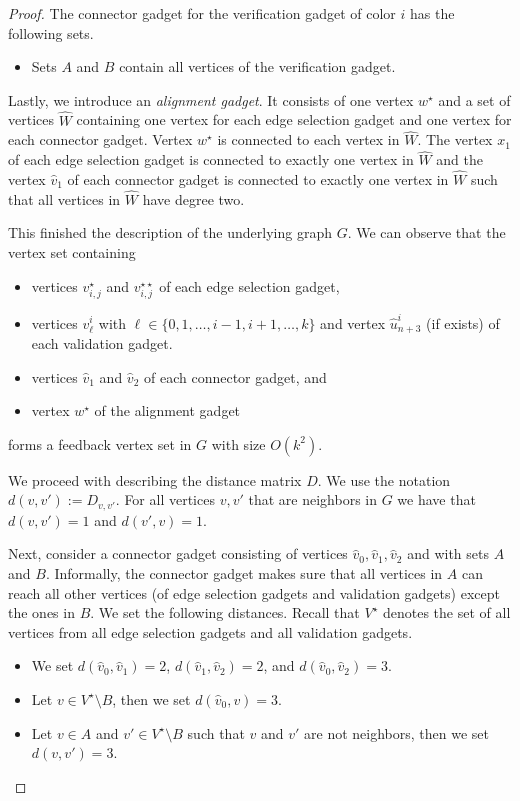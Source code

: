 \documentclass[11pt,a4paper]{article}
\theoremstyle{remark}
\theoremstyle{definition}
\begin{document}
\begin{proof}
    The connector gadget for the verification gadget of color $i$ has the following sets.
    \begin{itemize}
        \item Sets $A$ and $B$ contain all vertices of the verification gadget. %
    \end{itemize}

Lastly, we introduce an \emph{alignment gadget}. It consists of one vertex $w^\star$ and a set of vertices $\hat{W}$ containing one vertex for each edge selection gadget and one vertex for each connector gadget. Vertex $w^\star$ is connected to each vertex in $\hat{W}$.
The vertex $x_1$ of each edge selection gadget is connected to exactly one vertex in $\hat{W}$ and the vertex $\hat{v}_1$ of each connector gadget is connected to exactly one vertex in $\hat{W}$ such that all vertices in $\hat{W}$ have degree two.

This finished the description of the underlying graph $G$. We can observe that the vertex set containing
\begin{itemize}
    \item vertices $v_{i,j}^\star$ and $v_{i,j}^{\star\star}$ of each edge selection gadget,
    \item vertices $v^i_\ell$ with $\ell\in\{0,1,\ldots,i-1,i+1,\ldots,k\}$ and vertex $\hat{u}^i_{n+3}$ (if exists) of each validation gadget.
    \item vertices $\hat{v}_1$ and $\hat{v}_2$ of each connector gadget, and
    \item vertex $w^\star$ of the alignment gadget
\end{itemize}
forms a feedback vertex set in $G$ with size $O(k^2)$.

We proceed with describing the distance matrix $D$. We use the notation $d(v,v'):= D_{v,v'}$. For all vertices $v,v'$ that are neighbors in $G$ we have that $d(v,v')=1$ and $d(v',v)=1$.

Next, consider a connector gadget consisting of vertices $\hat{v}_0,\hat{v}_1,\hat{v}_2$ and with sets $A$ and $B$. Informally, the connector gadget makes sure that all vertices in $A$ can reach all other vertices (of edge selection gadgets and validation gadgets) except the ones in $B$. We set the following distances. Recall that $V^\star$ denotes the set of all vertices from all edge selection gadgets and all validation gadgets.
\begin{itemize}
    \item We set $d(\hat{v}_0,\hat{v}_1)=2$, $d(\hat{v}_1,\hat{v}_2)=2$, and $d(\hat{v}_0,\hat{v}_2)=3$.
    \item Let $v\in V^\star\setminus B$, then we set $d(\hat{v}_0,v)=3$.
    \item Let $v\in A$ and $v'\in V^\star\setminus B$ such that $v$ and $v'$ are not neighbors, then we set $d(v,v')=3$.
\end{itemize}


\end{proof}
\end{document}
